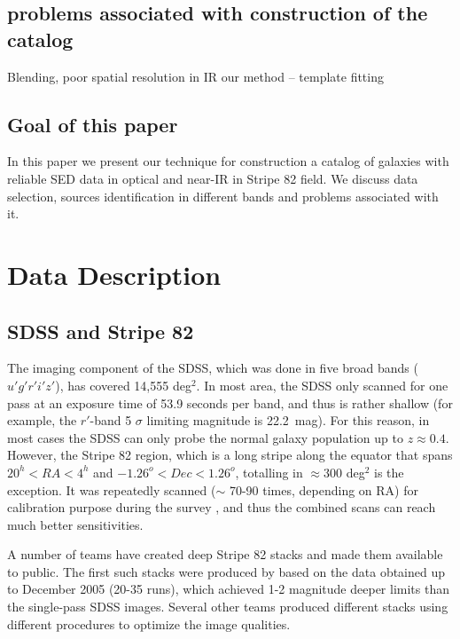 \documentclass[apj,iop]{emulateapj}
\begin{document}
\subsection{problems associated with construction of the catalog}
Blending, poor spatial resolution in IR
our method – template fitting

\subsection{Goal of this paper}

In this paper we present our technique for construction a catalog of galaxies with reliable SED data in optical and near-IR in Stripe 82 field. We discuss data selection, sources identification in different bands and problems associated with it.

\section{Data Description}


\subsection{SDSS and Stripe 82}

The imaging component of the SDSS, which was done in five broad bands ($u' g' r' i' z'$), has covered 14,555 deg$^2$. In most area, the SDSS only scanned for one pass at an exposure time of 53.9 seconds per band, and thus is rather shallow (for example, the $r'$-band 5 $\sigma$ limiting magnitude is 22.2~mag). For this reason, in most cases the SDSS can only probe the normal galaxy population up to $z\approx 0.4$. However, the Stripe 82 region, which is a long stripe along the equator that spans $20^h < RA < 4^h$ and $-1.26^o < Dec < 1.26^o$, totalling in $\approx 300$ deg$^2$ is the exception. It was repeatedly scanned ($\sim$ 70-90 times, depending on RA) for calibration purpose during the survey \citep{Adelman-McCarthy2007}, and thus the combined scans can reach much better sensitivities.

A number of teams have created deep Stripe 82 stacks and made them available to public. The first such stacks were produced by \citet[][]{Annis2014} based on the data obtained up to December 2005 (20-35 runs), which achieved 1-2 magnitude deeper limits than the single-pass SDSS images. Several other teams \citep[e.g.,][]{2009AJ....138..305J, 2014MNRAS.440.1296H} produced different stacks using different procedures to optimize the image qualities.
\end{document}
